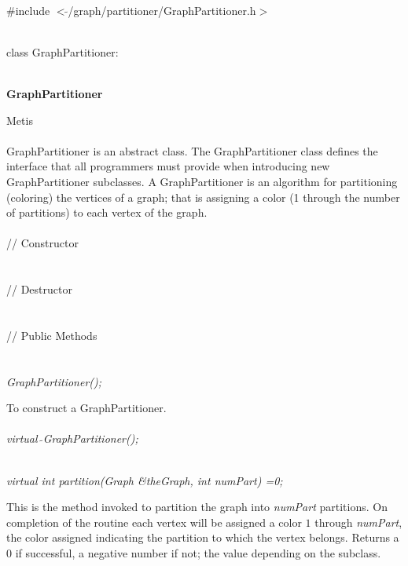 
   \\
\#include $<\tilde{ }$/graph/partitioner/GraphPartitioner.h$>$  


  \\
class GraphPartitioner:  


 \\
{\bf GraphPartitioner} 

\indent\indent Metis \\

  \\
\indent GraphPartitioner is an abstract class. The GraphPartitioner
class defines the interface that all programmers must provide when
introducing new GraphPartitioner subclasses. A GraphPartitioner is an
algorithm for partitioning (coloring) the vertices of a graph; that is
assigning a color (1 through the number of partitions) to each vertex
of the graph. \\

  \\
\indent\indent // Constructor \\
\indent{}  \\ \\
\indent\indent // Destructor  \\
\indent{}  \\ \\
\indent\indent // Public Methods  \\
\indent{} \\

  \\
{\em GraphPartitioner();}  

To construct a GraphPartitioner. \\

  \\
{\em virtual~$\tilde{}$GraphPartitioner();}  


  \\
{\em virtual int partition(Graph \&theGraph, int numPart) =0;} 

This is the method invoked to partition the graph into {\em numPart}
partitions. On completion of the routine each vertex will be assigned
a color $1$ through {\em numPart}, the color assigned indicating the
partition to which the vertex belongs. Returns a $0$ if successful, a
negative number if not; the value depending on the subclass.  \\



